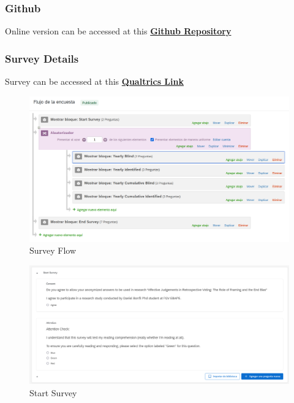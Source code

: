 \documentclass[
]{article}
\begin{document}
\hypertarget{github}{%
\subsubsection{Github}\label{github}}

Online version can be accessed at this
\href{https://danybonfil.github.io/start/}{\textbf{Github Repository}}

\hypertarget{survey-details}{%
\subsubsection{Survey Details}\label{survey-details}}

Survey can be accessed at this
\href{https://survey.fgv.br/jfe/form/SV_5jUiMOHHgM1t0DY}{\textbf{Qualtrics
Link}}

\begin{figure}
\hypertarget{fig:label}{%
\centering
\includegraphics[width=1\textwidth,height=1\textheight]{flow_survey.png}
\caption{Survey Flow}\label{fig:label}
}
\end{figure}

\begin{figure}
\hypertarget{fig:label}{%
\centering
\includegraphics[width=1\textwidth,height=1\textheight]{start_survey.png}
\caption{Start Survey}\label{fig:label}
}
\end{figure}
\end{document}
